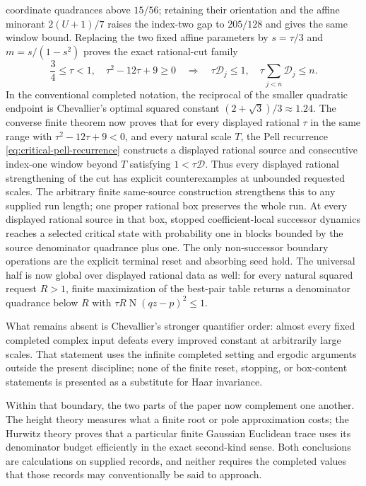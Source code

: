 \documentclass[11pt]{article}
\newcommand{\Norm}[1]{\operatorname{N}\!\left(#1\right)}
\begin{document}
coordinate quadrances above $15/56$; retaining their orientation and the
affine minorant $2(U+1)/7$ raises the index-two gap to $205/128$ and gives the
same window bound.  Replacing the two fixed affine parameters by
$s=\tau/3$ and $m=s/(1-s^2)$ proves the exact rational-cut family
\[
 \frac34\le\tau<1,\quad\tau^2-12\tau+9\ge0
 \quad\Longrightarrow\quad
 \tau\mathcal D_j\le1,\quad
 \tau\sum_{j<n}\mathcal D_j\le n.
\]
In the conventional completed notation, the reciprocal of the smaller
quadratic endpoint is Chevallier's optimal squared constant
$(2+\sqrt3)/3\approx1.24$.  The converse finite theorem now proves that for
every displayed rational $\tau$ in the same range with
$\tau^2-12\tau+9<0$, and every natural scale $T$, the Pell recurrence
\eqref{eq:critical-pell-recurrence} constructs a displayed rational source
and consecutive index-one window beyond $T$ satisfying
$1<\tau\mathcal D$.  Thus every displayed rational strengthening of the cut
has explicit counterexamples at unbounded requested scales.  The arbitrary
finite same-source construction strengthens this to any supplied run length;
one proper rational box preserves the whole run.  At every displayed rational
source in that box, stopped coefficient-local successor dynamics reaches a
selected critical state with probability one in blocks bounded by the source
denominator quadrance plus one.  The only non-successor boundary operations
are the explicit terminal reset and absorbing seed hold.  The universal half
is now global over displayed rational data as well: for every natural squared
request $R>1$, finite maximization of the best-pair table returns a denominator
quadrance below $R$ with $\tau R\Norm{qz-p}^{2}\le1$.

What remains absent is Chevallier's stronger quantifier order: almost every
fixed completed complex input defeats every improved constant at arbitrarily
large scales.  That statement uses the infinite completed setting and
ergodic arguments outside the present discipline; none of the finite reset,
stopping, or box-content statements is presented as a substitute for Haar
invariance.

Within that boundary, the two parts of the paper now complement one another.
The height theory measures what a finite root or pole approximation costs;
the Hurwitz theory proves that a particular finite Gaussian Euclidean trace
uses its denominator budget efficiently in the exact second-kind sense.  Both
conclusions are calculations on supplied records, and neither requires the
completed values that those records may conventionally be said to approach.
\end{document}
